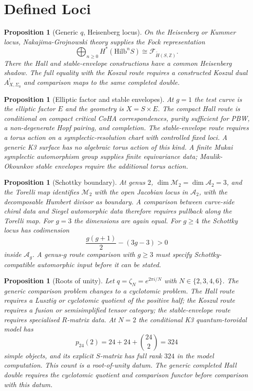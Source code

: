 \documentclass[11pt]{article}
\newtheorem{proposition}[theorem]{Proposition}
\providecommand{\Hilb}{\mathrm{Hilb}}
\providecommand{\ZZ}{\mathbb{Z}}
\begin{document}
\section{Defined Loci}
\label{sec:defined-loci}

\begin{proposition}[Generic $q$, Heisenberg locus]
\label{prop:g0-heisenberg-locus}
On the Heisenberg or Kummer locus, Nakajima-Grojnowski theory supplies
the Fock representation
\[
 \bigoplus_{n\geq 0} H^*(\Hilb^n S)
 \cong
 \mathcal{F}_{\widetilde H(S,\ZZ)}.
\]
There the Hall and stable-envelope constructions have a common
Heisenberg shadow. The full equality with the Koszul route requires a
constructed Koszul dual $A_{X,\Sigma_0}^{!}$ and comparison maps to the
same completed double.
\end{proposition}

\begin{proposition}[Elliptic factor and stable envelopes]
\label{prop:g1-stable-envelope-scope}
At $g=1$ the test curve is the elliptic factor $E$ and the geometry is
$X=S\times E$. The compact Hall route is conditional on compact
critical CoHA correspondences, purity sufficient for PBW, a
non-degenerate Hopf pairing, and completion. The stable-envelope route
requires a torus action on a symplectic-resolution chart with controlled
fixed loci. A generic K3 surface has no algebraic torus action of this
kind. A finite Mukai symplectic automorphism group supplies finite
equivariance data; Maulik-Okounkov stable envelopes require the
additional torus action.
\end{proposition}

\begin{proposition}[Schottky boundary]
\label{prop:schottky-boundary}
At genus $2$, $\dim \mathcal M_2=\dim \mathcal A_2=3$, and the Torelli
map identifies $\mathcal M_2$ with the open Jacobian locus in
$\mathcal A_2$, with the decomposable Humbert divisor as boundary. A
comparison between curve-side chiral data and Siegel automorphic data
therefore requires pullback along the Torelli map. For $g=3$ the
dimensions are again equal. For $g\geq 4$ the Schottky locus has
codimension
\[
 \frac{g(g+1)}{2}-(3g-3)>0
\]
inside $\mathcal A_g$. A genus-$g$ route comparison with $g\geq 3$
must specify Schottky-compatible automorphic input before it can be
stated.
\end{proposition}

\begin{proposition}[Roots of unity]
\label{prop:roots-of-unity-scope}
Let $q=\zeta_N=e^{2\pi i/N}$ with $N\in\{2,3,4,6\}$. The generic
comparison problem changes to a cyclotomic problem. The Hall route
requires a Lusztig or cyclotomic quotient of the positive half; the
Koszul route requires a fusion or semisimplified tensor category; the
stable-envelope route requires specialised $R$-matrix data. At $N=2$
the conditional K3 quantum-toroidal model has
\[
 p_{24}(2)=24+24+\binom{24}{2}=324
\]
simple objects, and its explicit $S$-matrix has full rank $324$ in the
model computation. This count is a root-of-unity datum. The generic
completed Hall double requires the cyclotomic quotient and comparison
functor before comparison with this datum.
\end{proposition}
\end{document}
